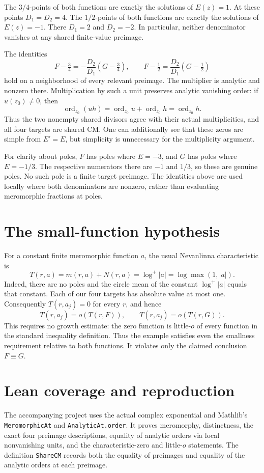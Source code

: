 \documentclass[11pt]{article}
\begin{document}
The $3/4$-points of both functions are exactly the solutions of $E(z)=1$. At these points $D_1=D_2=4$. The $1/2$-points of both functions are exactly the solutions of $E(z)=-1$. There $D_1=2$ and $D_2=-2$. In particular, neither denominator vanishes at any shared finite-value preimage.

The identities
\[
 F-\tfrac34=-\frac{D_2}{D_1}(G-\tfrac34),\qquad
 F-\tfrac12=\frac{D_2}{D_1}(G-\tfrac12)
\]
hold on a neighborhood of every relevant preimage. The multiplier is analytic and nonzero there. Multiplication by such a unit preserves analytic vanishing order: if $u(z_0)\ne0$, then
\[
\operatorname{ord}_{z_0}(uh)=\operatorname{ord}_{z_0}u+
\operatorname{ord}_{z_0}h=\operatorname{ord}_{z_0}h.
\]
Thus the two nonempty shared divisors agree with their actual multiplicities, and all four targets are shared CM. One can additionally see that these zeros are simple from $E'=E$, but simplicity is unnecessary for the multiplicity argument.

For clarity about poles, $F$ has poles where $E=-3$, and $G$ has poles where $E=-1/3$. The respective numerators there are $-1$ and $1/3$, so these are genuine poles. No such pole is a finite target preimage. The identities above are used locally where both denominators are nonzero, rather than evaluating meromorphic fractions at poles.

\section{The small-function hypothesis}
For a constant finite meromorphic function $a$, the usual Nevanlinna characteristic is
\[
T(r,a)=m(r,a)+N(r,a)=\log^+|a|=\log\max(1,|a|).
\]
Indeed, there are no poles and the circle mean of the constant $\log^+|a|$ equals that constant. Each of our four targets has absolute value at most one. Consequently $T(r,a_j)=0$ for every $r$, and hence
\[
T(r,a_j)=o(T(r,F)),\qquad T(r,a_j)=o(T(r,G)).
\]
This requires no growth estimate: the zero function is little-$o$ of every function in the standard inequality definition. Thus the example satisfies even the smallness requirement relative to both functions. It violates only the claimed conclusion $F\equiv G$.

\section{Lean coverage and reproduction}
The accompanying project uses the actual complex exponential and Mathlib's \texttt{MeromorphicAt} and \texttt{AnalyticAt.order}. It proves meromorphy, distinctness, the exact four preimage descriptions, equality of analytic orders via local nonvanishing units, and the characteristic-zero and little-$o$ statements. The definition \texttt{ShareCM} records both the equality of preimages and equality of the analytic orders at each preimage.
\end{document}
